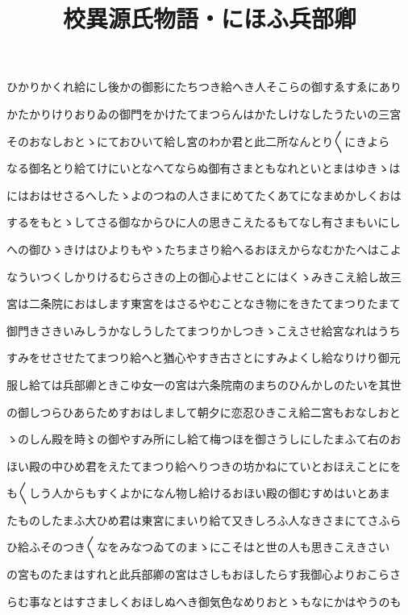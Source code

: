 \documentclass[a4paper,11pt,landscape]{ltjtarticle}
\title{校異源氏物語・にほふ兵部卿}
\date{}
\begin{document}
\maketitle

ひかりかくれ給にし後かの御影にたちつき給へき人そこらの御すゑすゑにあり
\par\medskip
かたかりけりおりゐの御門をかけたてまつらんはかたしけなしたうたいの三宮
\par\medskip
そのおなしおとゝにておひいて給し宮のわか君と此二所なんとり〱にきよら
\par\medskip
なる御名とり給てけにいとなへてならぬ御有さまともなれといとまはゆきゝは
\par\medskip
にはおはせさるへしたゝよのつねの人さまにめてたくあてになまめかしくおは
\par\medskip
するをもとゝしてさる御なからひに人の思きこえたるもてなし有さまもいにし
\par\medskip
への御ひゝきけはひよりもやゝたちまさり給へるおほえからなむかたへはこよ
\par\medskip
なういつくしかりけるむらさきの上の御心よせことにはくゝみきこえ給し故三
\par\medskip
宮は二条院におはします東宮をはさるやむことなき物にをきたてまつりたまて
\par\medskip
御門きさきいみしうかなしうしたてまつりかしつきゝこえさせ給宮なれはうち
\par\medskip
すみをせさせたてまつり給へと猶心やすき古さとにすみよくし給なりけり御元
\par\medskip
服し給ては兵部卿ときこゆ女一の宮は六条院南のまちのひんかしのたいを其世
\par\medskip
の御しつらひあらためすおはしまして朝夕に恋忍ひきこえ給二宮もおなしおと
\par\medskip
ゝのしん殿を時〻の御やすみ所にし給て梅つほを御さうしにしたまふて右のお
\par\medskip
ほい殿の中ひめ君をえたてまつり給へりつきの坊かねにていとおほえことにを
\par\medskip
も〱しう人からもすくよかになん物し給けるおほい殿の御むすめはいとあま
\par\medskip
たものしたまふ大ひめ君は東宮にまいり給て又きしろふ人なきさまにてさふら
\par\medskip
ひ給ふそのつき〱なをみなつゐてのまゝにこそはと世の人も思きこえきさい
\par\medskip
の宮ものたまはすれと此兵部卿の宮はさしもおほしたらす我御心よりおこらさ
\par\medskip
らむ事なとはすさましくおほしぬへき御気色なめりおとゝもなにかはやうのも
\end{document}
